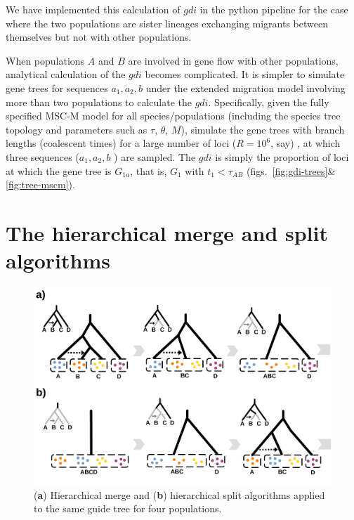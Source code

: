 \documentclass{article1}
\begin{document}
We have implemented this calculation of $gdi$ in the python pipeline for the case
where the two populations are sister lineages exchanging migrants between themselves but
not with other populations.

When populations $A$ and $B$ are involved in gene flow with other populations,
analytical calculation of the $gdi$ becomes complicated.  It is simpler to simulate gene
trees for sequences $a_1, a_2, b$ under the extended migration model involving more than
two populations to calculate the $gdi$.  Specifically, given the fully specified MSC-M
model for all species/populations (including the species tree topology and parameters
such as $\tau$, $\theta$, $M$), simulate the gene trees with branch lengths (coalescent
times) for a large number of loci ($R = 10^6$, say) , at which three sequences ($a_1,
a_2, b$ ) are sampled.  The $gdi$ is simply the proportion of loci at which the gene
tree is $G_{1a}$, that is, $G_1$ with $t_1 < \tau_{AB}$
(figs.~\ref{fig:gdi-trees}\&\ref{fig:tree-mscm}).


\section{The hierarchical merge and split algorithms}

\begin{figure}[t]
   \centering %
   \includegraphics[scale=0.25]{figs/Methods/HM_algo} %
   
   \caption{(\textbf{a}) Hierarchical merge and (\textbf{b}) hierarchical split
   algorithms applied to the same guide tree for four populations. \\%
	} 
	\label{fig:gdi-algorithms}
\end{figure}
\end{document}
